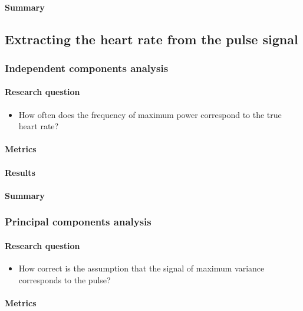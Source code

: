 \paragraph{Summary}

\subsection{Extracting the heart rate from the pulse signal}
\subsubsection{Independent components analysis}
\label{section:ica_assumption}
\paragraph{Research question}
\begin{itemize}
    \item How often does the frequency of maximum power correspond to the true heart rate?
\end{itemize}
\paragraph{Metrics}
\paragraph{Results}

\paragraph{Summary}

\subsubsection{Principal components analysis}
\paragraph{Research question}
\begin{itemize}
    \item How correct is the assumption that the signal of maximum variance corresponds to the pulse?
\end{itemize}
\paragraph{Metrics}
